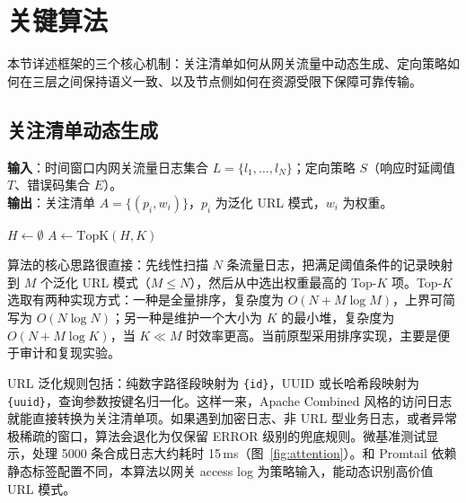 \section{关键算法}

本节详述框架的三个核心机制：关注清单如何从网关流量中动态生成、定向策略如何在三层之间保持语义一致、以及节点侧如何在资源受限下保障可靠传输。

\subsection{关注清单动态生成}
\textbf{输入}：时间窗口内网关流量日志集合 $L=\{l_1,\ldots,l_N\}$；定向策略 $S$（响应时延阈值 $T$、错误码集合 $E$）。\\
\textbf{输出}：关注清单 $A=\{(p_i,w_i)\}$，$p_i$ 为泛化 URL 模式，$w_i$ 为权重。

\begin{algorithm}[htbp]
\caption{关注清单动态生成}\label{alg:attention}
$H \leftarrow \emptyset$\;
$A \leftarrow \mathrm{TopK}(H, K)$ 
\;
\end{algorithm}

算法的核心思路很直接：先线性扫描 $N$ 条流量日志，把满足阈值条件的记录映射到 $M$ 个泛化 URL 模式（$M\leq N$），然后从中选出权重最高的 Top-$K$ 项。Top-$K$ 选取有两种实现方式：一种是全量排序，复杂度为 $O(N+M\log M)$，上界可简写为 $O(N\log N)$；另一种是维护一个大小为 $K$ 的最小堆，复杂度为 $O(N+M\log K)$，当 $K \ll M$ 时效率更高。当前原型采用排序实现，主要是便于审计和复现实验。

URL 泛化规则包括：纯数字路径段映射为 \texttt{\{id\}}，UUID 或长哈希段映射为 \texttt{\{uuid\}}，查询参数按键名归一化。这样一来，Apache Combined 风格的访问日志就能直接转换为关注清单项。如果遇到加密日志、非 URL 型业务日志，或者异常极稀疏的窗口，算法会退化为仅保留 ERROR 级别的兜底规则。微基准测试显示，处理 5000 条合成日志大约耗时 15\,ms（图~\ref{fig:attention}）。和 Promtail 依赖静态标签配置不同，本算法以网关 access log 为策略输入，能动态识别高价值 URL 模式。

